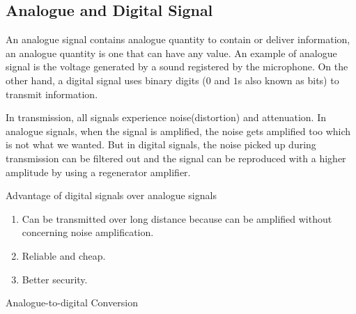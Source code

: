 \documentclass{article}
\begin{document}
\subsection{Analogue and Digital Signal }


An analogue signal contains analogue quantity to contain or deliver information, an analogue quantity is one that can have any value. An example of analogue signal is the voltage generated by a sound registered by the microphone. On the other hand, a digital signal uses binary digits ($0$ and $1$s also known as bits) to transmit information. 

In transmission, all signals experience noise(distortion) and attenuation. In analogue signals, when the signal is amplified, the noise gets amplified too which is not what we wanted. But in digital signals, the noise picked up during transmission can be filtered out and the signal can be reproduced with a higher amplitude by using a regenerator amplifier.
\newpage
\begin{flushleft}
\item Advantage of digital signals over analogue signals
\end{flushleft}
\begin{enumerate}
    \item Can be transmitted over long distance because can be amplified without concerning noise amplification. 
    \item Reliable and cheap.
    \item Better security.
\end{enumerate}


\begin{flushleft}
\item Analogue-to-digital Conversion
\end{flushleft}
\end{document}

